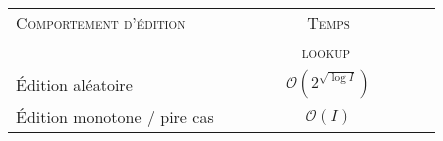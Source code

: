 
\begin{tabularx}{0.6\textwidth}{@{}Xc@{}}
  \toprule
  \textsc{Comportement d'édition} & \textsc{Temps} \\
  & \ \ \ \ \ \ \ \ \ \textsc{lookup} \ \ \ \ \ \ \ \ \ \\ \midrule
  Édition aléatoire & $\mathcal{O}(2^{\sqrt{\log I}})$ \\
  Édition monotone / pire cas & $\mathcal{O}(I)$ \\ \bottomrule
\end{tabularx}

